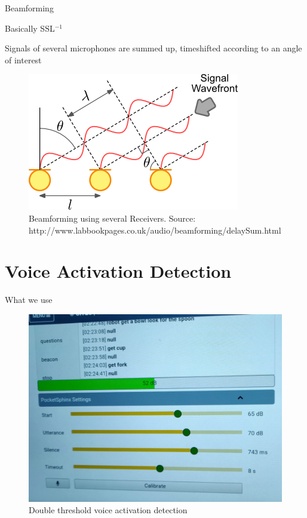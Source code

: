 \documentclass{beamer}
\begin{document}
	\begin{frame}{Beamforming}
		\begin{alertblock}{Basically SSL$^{-1}$}
		
			Signals of several microphones are summed up, timeshifted according to an angle of interest
		\end{alertblock}
		\begin{figure}[ht]
			\centering
			\includegraphics[width=.6\linewidth]{Bilder/beamform.png}
			\caption{Beamforming using several Receivers. Source: http://www.labbookpages.co.uk/audio/beamforming/delaySum.html}
		\end{figure}
	\end{frame}
	
	\section{Voice Activation Detection}%
	
	\begin{frame}{What we use}
		\begin{figure}[ht]
			\centering
			\includegraphics[width=.8\linewidth]{Bilder/VAD.jpg}
			\caption{Double threshold voice activation detection}
		\end{figure}
	\end{frame}
	
\end{document}
